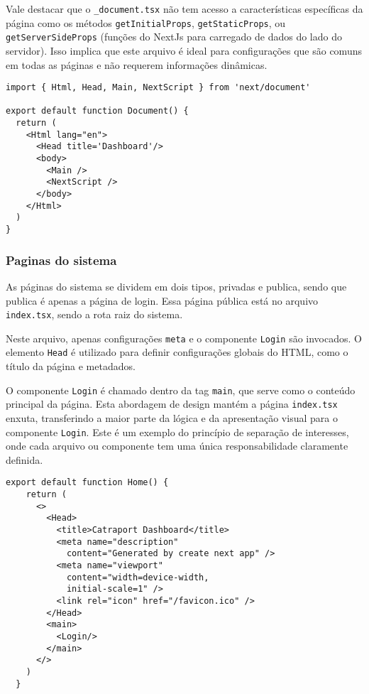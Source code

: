 Vale destacar que o \texttt{\_document.tsx} não tem acesso a características específicas da página como os métodos \texttt{getInitialProps}, \texttt{getStaticProps}, ou \texttt{getServerSideProps} (funções do NextJs para carregado de dados do lado do servidor). Isso implica que este arquivo é ideal para configurações que são comuns em todas as páginas e não requerem informações dinâmicas.

\begin{verbatim}
import { Html, Head, Main, NextScript } from 'next/document'

export default function Document() {
  return (
    <Html lang="en">
      <Head title='Dashboard'/>
      <body>
        <Main />
        <NextScript />
      </body>
    </Html>
  )
}
\end{verbatim}

\subsubsection{Paginas do sistema}\label{subsec:}
As páginas do sistema se dividem em dois tipos, privadas e publica, sendo que publica é apenas a página de login. Essa página pública está no arquivo \texttt{index.tsx}, sendo a rota raiz do sistema. 

Neste arquivo, apenas configurações \texttt{meta} e o componente \texttt{Login} são invocados. O elemento \texttt{Head} é utilizado para definir configurações globais do HTML, como o título da página e metadados. 

O componente \texttt{Login} é chamado dentro da tag \texttt{main}, que serve como o conteúdo principal da página. Esta abordagem de design mantém a página \texttt{index.tsx} enxuta, transferindo a maior parte da lógica e da apresentação visual para o componente \texttt{Login}. Este é um exemplo do princípio de separação de interesses, onde cada arquivo ou componente tem uma única responsabilidade claramente definida.

\begin{verbatim}
export default function Home() {
    return (
      <>
        <Head>
          <title>Catraport Dashboard</title>
          <meta name="description" 
            content="Generated by create next app" />
          <meta name="viewport" 
            content="width=device-width,
            initial-scale=1" />
          <link rel="icon" href="/favicon.ico" />
        </Head>
        <main>
          <Login/>
        </main>
      </>
    )
  }
\end{verbatim}

